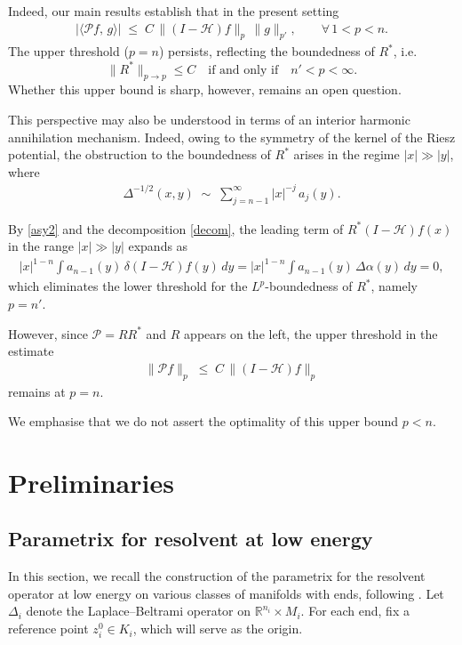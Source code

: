 \documentclass[12pt]{amsart}
\begin{document}
Indeed, our main results establish that in the present setting
\begin{align*}
    \big|\langle \mathcal{P}f,\,g\rangle\big| 
    \;\le\; C\, \|(I-\mathcal{H})f\|_p \,\|g\|_{p'}, 
    \qquad \forall\, 1<p<n.
\end{align*}
The upper threshold ($p=n$) persists, reflecting the boundedness of $R^*$, i.e.
\[
\|R^*\|_{p\to p}\le C 
\quad \text{if and only if} \quad 
n'<p<\infty.
\] 
Whether this upper bound is sharp, however, remains an open question. 




This perspective may also be understood in terms of an interior harmonic annihilation mechanism.  
Indeed, owing to the symmetry of the kernel of the Riesz potential, the obstruction to the boundedness of $R^*$ arises in the regime $|x| \gg |y|$, where
\begin{align}\label{asy2}
    \Delta^{-1/2}(x,y) \;\sim\; \sum_{j = n-1}^\infty |x|^{-j}\, a_j(y).
\end{align}

By \eqref{asy2} and the decomposition \eqref{decom}, the leading term of $R^*(I-\mathcal{H})f(x)$ in the range $|x| \gg |y|$ expands as
\begin{align*}
 |x|^{1-n} \int a_{n-1}(y)\, \delta (I-\mathcal{H})f(y)\,dy 
   = |x|^{1-n} \int a_{n-1}(y)\, \Delta \alpha(y)\,dy 
   = 0,
\end{align*}
which eliminates the lower threshold for the $L^p$-boundedness of $R^*$, namely $p=n'$.  

However, since $\mathcal{P}=RR^*$ and $R$ appears on the left, the upper threshold in the estimate
\begin{align*}
    \|\mathcal{P}f\|_p \;\le\; C \,\|(I-\mathcal{H})f\|_p
\end{align*}
remains at $p=n$.  

We emphasise that we do not assert the optimality of this upper bound $p<n$.







\section{Preliminaries}



\subsection{Parametrix for resolvent at low energy} 
In this section, we recall the construction of the parametrix for the resolvent operator at low energy on various classes of manifolds with ends, following \cite{CCH,HS,HNS}.  
Let $\Delta_i$ denote the Laplace--Beltrami operator on $\mathbb{R}^{n_i} \times M_i$. For each end, fix a reference point $z_i^0 \in K_i$, which will serve as the origin.  
\end{document}
